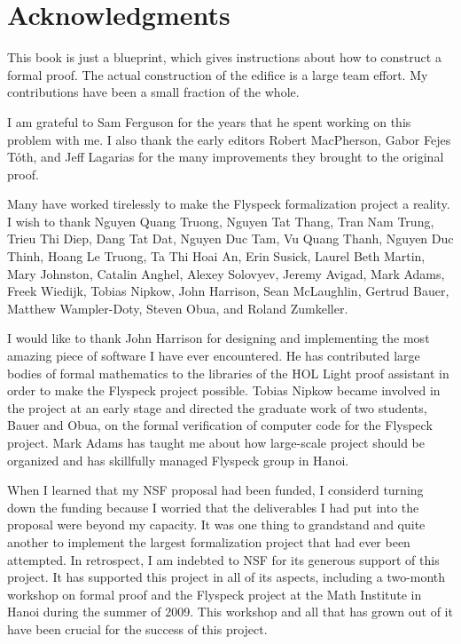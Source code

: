 

\section*{Acknowledgments}

This book is just a blueprint, which gives instructions about how to
construct a formal proof.  The actual construction of the edifice is a
large team effort.  My contributions have been a small fraction of the
whole.

I am grateful to Sam Ferguson for the years that he spent working on
this problem with me.  I also thank the early editors Robert
MacPherson, Gabor Fejes T\'oth, and Jeff Lagarias for the many
improvements they brought to the original proof.

Many have worked tirelessly to make the Flyspeck formalization project
a reality.  I wish to thank Nguyen Quang Truong, Nguyen Tat Thang,
Tran Nam Trung, Trieu Thi Diep, Dang Tat Dat, Nguyen Duc Tam, Vu Quang
Thanh, Nguyen Duc Thinh, Hoang Le Truong, Ta Thi Hoai An, Erin Susick,
Laurel Beth Martin, Mary Johnston, Catalin Anghel, Alexey Solovyev,
Jeremy Avigad, Mark Adams, Freek Wiedijk, Tobias Nipkow, John
Harrison, Sean McLaughlin, Gertrud Bauer, Matthew Wampler-Doty, Steven
Obua, and Roland Zumkeller.


I would like to thank John Harrison for designing and implementing the
most amazing piece of software I have ever encountered.  He has
contributed large bodies of formal mathematics to the libraries of the
HOL Light proof assistant in order to make the Flyspeck project
possible.  Tobias Nipkow became involved in the project at an early
stage and directed the graduate work of two students, Bauer and Obua,
on the formal verification of computer code for the Flyspeck
project. Mark Adams has taught me about how large-scale project should
be organized and has skillfully managed Flyspeck group in Hanoi.

When I learned that my NSF proposal had been funded, I considerd
turning down the funding because I worried that the deliverables I had
put into the proposal were beyond my capacity.  It was one thing to
grandstand and quite another to implement the largest formalization
project that had ever been attempted.  In retrospect, I am indebted to
NSF for its generous support of this project.  It has supported this
project in all of its aspects, including a two-month workshop on
formal proof and the Flyspeck project at the Math Institute in Hanoi
during the summer of 2009.  This workshop and all that has grown out
of it have been crucial for the success of this project.

